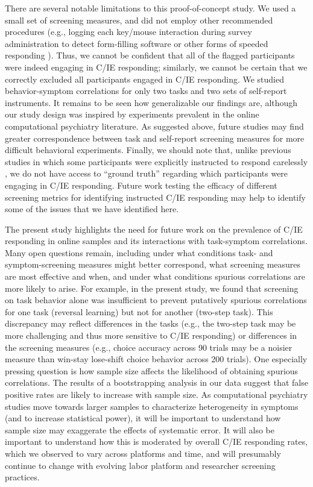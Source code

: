 \documentclass[a4paper,notitlepage,12pt]{article}
\begin{document}
\begin{refsection}[main]
There are several notable limitations to this proof-of-concept study. We used a small set of screening measures, and did not employ other recommended procedures (e.g., logging each key/mouse interaction during survey administration to detect form-filling software or other forms of speeded responding \cite{buchanan2018methods}). Thus, we cannot be confident that all of the flagged participants were indeed engaging in C/IE responding; similarly, we cannot be certain that we correctly excluded all participants engaged in C/IE responding. We studied behavior-symptom correlations for only two tasks and two sets of self-report instruments. It remains to be seen how generalizable our findings are, although our study design was inspired by experiments prevalent in the online computational psychiatry literature. As suggested above, future studies may find greater correspondence between task and self-report screening measures for more difficult behavioral experiments. Finally, we should note that, unlike previous studies in which some participants were explicitly instructed to respond carelessly \cite{buchanan2018methods}, we do not have access to ``ground truth'' regarding which participants were engaging in C/IE responding. Future work testing the efficacy of different screening metrics for identifying instructed C/IE responding may help to identify some of the issues that we have identified here.

The present study highlights the need for future work on the prevalence of C/IE responding in online samples and its interactions with task-symptom correlations. Many open questions remain, including under what conditions task- and symptom-screening measures might better correspond, what screening measures are most effective and when, and under what conditions spurious correlations are more likely to arise. For example, in the present study, we found that screening on task behavior alone was insufficient to prevent putatively spurious correlations for one task (reversal learning) but not for another (two-step task). This discrepancy may reflect differences in the tasks (e.g., the two-step task may be more challenging and thus more sensitive to C/IE responding) or differences in the screening measures (e.g., choice accuracy across 90 trials may be a noisier measure than win-stay lose-shift choice behavior across 200 trials). One especially pressing question is how sample size affects the likelihood of obtaining spurious correlations. The results of a bootstrapping analysis in our data suggest that false positive rates are likely to increase with sample size. As computational psychiatry studies move towards larger samples to characterize heterogeneity in symptoms (and to increase statistical power), it will be important to understand how sample size may exaggerate the effects of systematic error. It will also be important to understand how this is moderated by overall C/IE responding rates, which we observed to vary across platforms and time, and will presumably continue to change with evolving labor platform and researcher screening practices.


\end{refsection}
\end{document}

